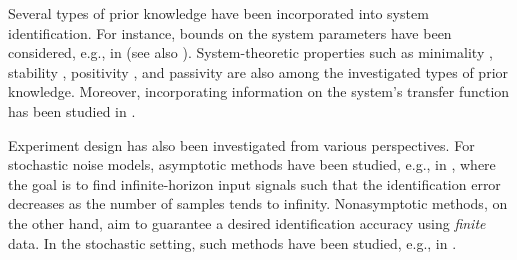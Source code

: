 \documentclass[journal,twoside,web]{ieeecolor}
\begin{document}
Several types of prior knowledge have been incorporated into system identification. For instance, bounds on the system parameters have been considered, e.g., in \cite{rojas2007robust} (see also \cite[Sec. 2]{hjalmarsson2005experiment}). System-theoretic properties such as minimality \cite{verhaegen1992subspace}, stability \cite{van2002identification,lacy2003subspace,miller2013subspace}, positivity \cite{de2002identification}, and passivity \cite{goethals2003identification,rodrigues2021novel} are also among the investigated types of prior knowledge. Moreover, incorporating information on the system's transfer function has been studied in \cite{inoue2019subspace,khosravi2023kernel}. %

Experiment design has also been investigated from various perspectives. For stochastic noise models, asymptotic methods have been studied, e.g., in \cite{rojas2007robust,gevers1986optimal,deistler1995consistency}, where the goal is to find infinite-horizon input signals such that the identification error decreases as the number of samples tends to infinity. Nonasymptotic methods, on the other hand, aim to guarantee a desired identification accuracy using \emph{finite} data. In the stochastic setting, such methods have been studied, e.g., in \cite{weyer2002finite,campi2002finite,venkatasubramanian2025beyond}. 
\end{document}
